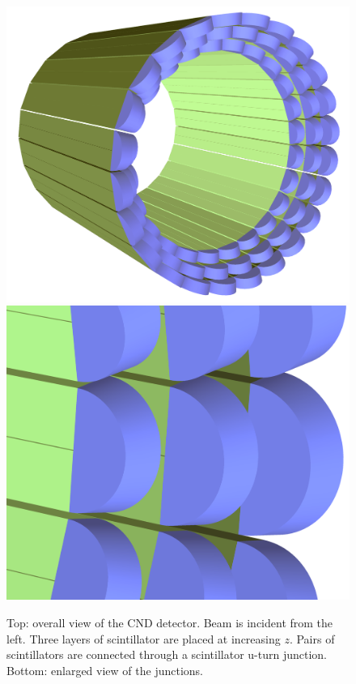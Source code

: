 \begin{figure}
	\centering
	\includegraphics[width=0.99\columnwidth,keepaspectratio]{img/cndGeometry.png}
	\includegraphics[width=0.99\columnwidth,keepaspectratio]{img/cndDetail.png}
	\caption{Top: overall view of the CND detector. Beam is incident from the left.
	         Three layers of scintillator are placed at increasing $z$. Pairs of scintillators
             are connected through a scintillator u-turn junction. Bottom: enlarged view of the junctions. }
	\label{fig:cndGeometry}
\end{figure}


